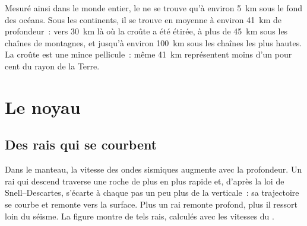 Mesuré ainsi dans le monde entier, le  ne se trouve qu'à environ
\qty{5}{km} sous le fond des océans. Sous les continents, il se trouve en
moyenne à environ \qty{41}{km} de profondeur~: vers \qty{30}{km} là où la
croûte a été étirée, à plus de \qty{45}{km} sous les chaînes de montagnes,
et jusqu'à environ \qty{100}{km} sous les chaînes les plus hautes. La croûte
est une mince pellicule~: même \qty{41}{km} représentent moins d'un pour
cent du rayon de la Terre.

\section{Le noyau}

\subsection{Des rais qui se courbent}

Dans le manteau, la vitesse des ondes sismiques augmente avec la profondeur.
Un rai qui descend traverse une roche de plus en plus rapide et, d'après la
loi de Snell--Descartes, s'écarte à chaque pas un peu plus de la
verticale~: sa trajectoire se courbe et remonte vers la surface. Plus un rai
remonte profond, plus il ressort loin du séisme. La figure montre de tels
rais, calculés avec les vitesses du .

